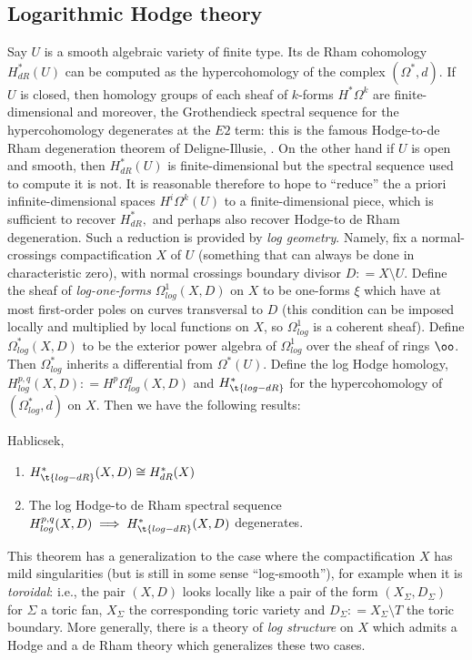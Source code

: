 \documentclass{article}
\begin{document}
\subsection{Logarithmic Hodge theory}
Say $U$ is a smooth algebraic variety of finite type. Its de Rham cohomology $H^*_{dR}(U)$ can be computed as the hypercohomology of the complex $(\Omega^*,d)$. If $U$ is closed, then homology groups of each sheaf of $k$-forms $H^*\Omega^k$ are finite-dimensional and moreover, the Grothendieck spectral sequence for the hypercohomology degenerates at the $E2$ term: this is the famous Hodge-to-de Rham degeneration theorem of Deligne-Illusie, \cite{deligne-illusie}. On the other hand if $U$ is open and smooth, then $H^*_{dR}(U)$ is finite-dimensional but the spectral sequence used to compute it is not. It is reasonable therefore to hope to ``reduce'' the a priori infinite-dimensional spaces $H^i\Omega^k(U)$ to a finite-dimensional piece, which is sufficient to recover $H^*_{dR},$ and perhaps also recover Hodge-to de Rham degeneration. Such a reduction is provided by \emph{log geometry}. Namely, fix a normal-crossings compactification $X$ of $U$ (something that can always be done in characteristic zero), with normal crossings boundary divisor $D : = X\setminus U$. Define the sheaf of \emph{log-one-forms} $\Omega^1_{log}(X, D)$ on $X$ to be one-forms $\xi$ which have at most first-order poles on curves transversal to $D$ (this condition can be imposed locally and multiplied by local functions on $X$, so $\Omega^1_{log}$ is a coherent sheaf). Define $\Omega^*_{log}(X, D)$ to be the exterior power algebra of $\Omega^1_{log}$ over the sheaf of rings $\oo$. Then $\Omega^*_{log}$ inherits a differential from $\Omega^*(U)$. Define the log Hodge homology, $H^{p, q}_{log}(X, D): = H^p\Omega^q_{log}(X, D)$ and $H^*_{\t{log-dR}}$ for the hypercohomology of $(\Omega^*_{log}, d)$ on $X$. Then we have the following results:
\begin{cthm}{Hablicsek, \cite{hablicsek}}
  \begin{enumerate}
  \item     $H^*_{\t{log-dR}}(X, D)\cong H^*_{dR}(X)$
  \item The log Hodge-to de Rham spectral sequence $H^{p, q}_{log}(X, D)\implies H^*_{\t{log-dR}}(X, D)$ degenerates. 
    \end{enumerate}
\end{cthm}
This theorem has a generalization to the case where the compactification $X$ has mild singularities (but is still in some sense ``log-smooth''), for example when it is \emph{toroidal}: i.e., the pair $(X, D)$ looks locally like a pair of the form $(X_\Sigma, D_\Sigma)$ for $\Sigma$ a toric fan, $X_\Sigma$ the corresponding toric variety and $D_{\Sigma}: = X_{\Sigma}\setminus T$ the toric boundary. More generally, there is a theory of \emph{log structure} on $X$ which admits a Hodge and a de Rham theory which generalizes these two cases.
\end{document}
